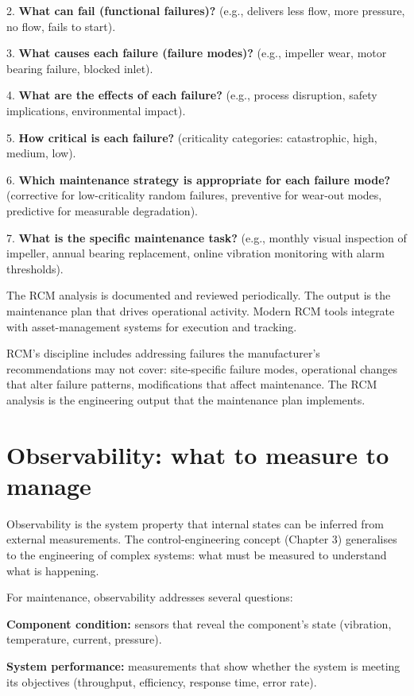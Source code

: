 2. \textbf{What can fail (functional failures)?} (e.g., delivers less flow, more pressure, no flow, fails to start).

3. \textbf{What causes each failure (failure modes)?} (e.g., impeller wear, motor bearing failure, blocked inlet).

4. \textbf{What are the effects of each failure?} (e.g., process disruption, safety implications, environmental impact).

5. \textbf{How critical is each failure?} (criticality categories: catastrophic, high, medium, low).

6. \textbf{Which maintenance strategy is appropriate for each failure mode?} (corrective for low-criticality random failures, preventive for wear-out modes, predictive for measurable degradation).

7. \textbf{What is the specific maintenance task?} (e.g., monthly visual inspection of impeller, annual bearing replacement, online vibration monitoring with alarm thresholds).

The RCM analysis is documented and reviewed periodically. The output is the maintenance plan that drives operational activity. Modern RCM tools integrate with asset-management systems for execution and tracking.

RCM's discipline includes addressing failures the manufacturer's recommendations may not cover: site-specific failure modes, operational changes that alter failure patterns, modifications that affect maintenance. The RCM analysis is the engineering output that the maintenance plan implements.

\section{Observability: what to measure to manage}

Observability is the system property that internal states can be inferred from external measurements. The control-engineering concept (Chapter 3) generalises to the engineering of complex systems: what must be measured to understand what is happening.

For maintenance, observability addresses several questions:

\textbf{Component condition:} sensors that reveal the component's state (vibration, temperature, current, pressure).

\textbf{System performance:} measurements that show whether the system is meeting its objectives (throughput, efficiency, response time, error rate).

